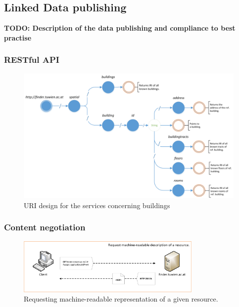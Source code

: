 \documentclass[draft,final]{vutinfth} %
\newcommand{\todo}[1]{{\color{red}\textbf{TODO: {#1}}}} %
\begin{document}
\subsection{Linked Data publishing}
\label{solution-architectural-prototype:ld-publishing}
\todo{Description of the data publishing and compliance to best practise}

\subsubsection{RESTful API}

\begin{figure}[h]
    \centering
    \includegraphics[width=1.0\textwidth]{graphics/buildingApiTree.png}
    \caption{URI design for the services concerning buildings}
    \label{fig:solution-architectural-prototype:restful-api}
\end{figure}

\subsubsection{Content negotiation}

\begin{figure}[h]
    \centering
    \includegraphics[width=0.8\textwidth]{graphics/solution/uri-strategy/uriStrategyMachineReadable.png}
    \caption{Requesting machine-readable representation of a given resource.}
    \label{fig:solution-architectural-prototype:ld-publishing:machine-readable}
\end{figure}
\end{document}
